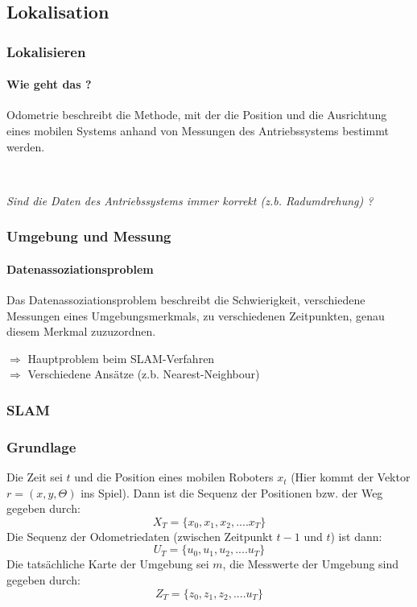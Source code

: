 \documentclass{beamer}
\begin{document}
\subsection{Lokalisation}

\begin{frame}
\frametitle{Lokalisieren}
\framesubtitle{Wie geht das ?}
\begin{Definition}
Odometrie beschreibt die Methode, mit der die Position und die Ausrichtung eines mobilen Systems anhand von  Messungen des Antriebssystems bestimmt werden.
\end{Definition}
\quad \\
\begin{center}
\textit{Sind die Daten des Antriebssystems immer korrekt (z.b. Radumdrehung) ?}
\end{center}
\end{frame}

 \begin{frame}
\frametitle{Umgebung und Messung}
\framesubtitle{Datenassoziationsproblem}
\begin{Definition}
Das Datenassoziationsproblem beschreibt die Schwierigkeit, verschiedene Messungen eines Umgebungsmerkmals, zu verschiedenen Zeitpunkten, genau diesem Merkmal zuzuzordnen.
\end{Definition}
$\Rightarrow$ Hauptproblem beim SLAM-Verfahren\\
$\Rightarrow$ Verschiedene Ansätze (z.b. Nearest-Neighbour)

\end{frame}


\subsubsection{SLAM}

\begin{frame}
\frametitle{Grundlage}

Die Zeit sei $t$ und die Position eines mobilen Roboters $x_t$ (Hier kommt der Vektor $r = (x,y,\Theta)$ ins Spiel).
Dann ist die Sequenz der Positionen bzw. der Weg gegeben durch:
\begin{equation*}
X_T = \{ x_0,x_1,x_2,....x_T \}
\end{equation*}
Die Sequenz der Odometriedaten (zwischen Zeitpunkt $t-1$ und $t$) ist dann:
\begin{equation*}
U_T = \{ u_0,u_1,u_2,....u_T \}
\end{equation*}
Die tatsächliche Karte der Umgebung sei $m$, die Messwerte der Umgebung sind gegeben durch:
\begin{equation*}
Z_T = \{ z_0,z_1,z_2,....u_T \}
\end{equation*}

\end{frame}
\end{document}
